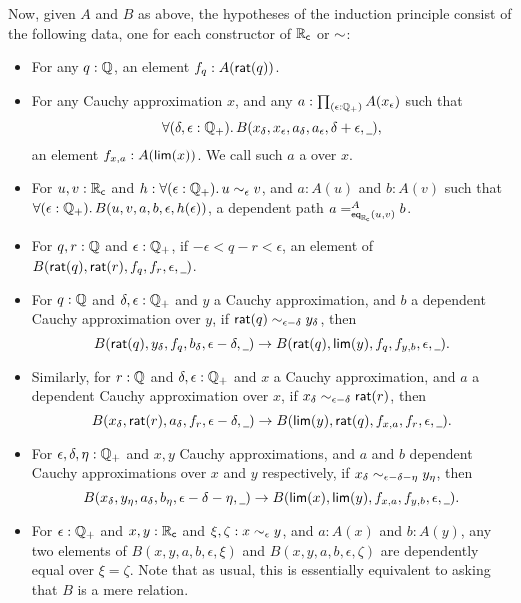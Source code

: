 Now, given $A$ and $B$ as above, the hypotheses of the induction principle consist of the following data, one for each constructor of $\RC$ or $\closesym$:
\begin{itemize}
\item For any $q : \Q$, an element $f_q:A(\rcrat(q))$.
\item For any Cauchy approximation $x$, and any $a:\prd{\epsilon:\Qp} A(x_\epsilon)$ such that
  \begin{equation}
    \fall{\delta, \epsilon : \Qp} B(x_\delta,x_\epsilon,a_\delta,a_\epsilon,\delta+\epsilon,\blank),\label{eq:depCauchyappx}
  \end{equation}
  an element $f_{x,a}:A(\rclim(x))$.  We call such $a$ a  over $x$.
\item For $u, v : \RC$ and $h:\fall{\epsilon : \Qp} u \close\epsilon v$, and $a:A(u)$ and $b:A(v)$ such that $\fall{\epsilon:\Qp} B(u,v,a,b,\epsilon,h(\epsilon))$, a dependent path $\dpath{A}{\rceq(u,v)}{a}{b}$.
\item For $q,r:\Q$ and $\epsilon:\Qp$, if $-\epsilon < q - r < \epsilon$, an element of $B(\rcrat(q),\rcrat(r),f_q,f_r,\epsilon,\blank)$.
\item For $q:\Q$ and $\delta,\epsilon:\Qp$ and $y$ a Cauchy approximation, and $b$ a dependent Cauchy approximation over $y$, if $\rcrat(q) \close{\epsilon - \delta} y_\delta$, then
  \[B(\rcrat(q),y_\delta,f_q,b_\delta,\epsilon-\delta,\blank)
  \to
  B(\rcrat(q),\rclim(y),f_q,f_{y,b},\epsilon,\blank).\]
\item Similarly, for $r:\Q$ and $\delta,\epsilon:\Qp$ and $x$ a Cauchy approximation, and $a$ a dependent Cauchy approximation over $x$, if $x_\delta \close{\epsilon - \delta} \rcrat(r)$, then
  \[B(x_\delta,\rcrat(r),a_\delta,f_r,\epsilon-\delta,\blank) \to
  B(\rclim(y),\rcrat(q),f_{x,a},f_r,\epsilon,\blank).
  \]
\item For $\epsilon,\delta,\eta:\Qp$ and $x,y$ Cauchy approximations, and $a$ and $b$ dependent Cauchy approximations over $x$ and $y$ respectively, if $x_\delta \close{\epsilon - \delta - \eta} y_\eta$, then
  \[ B(x_\delta,y_\eta,a_\delta,b_\eta,{\epsilon - \delta - \eta},\blank)\to
  B(\rclim(x),\rclim(y),f_{x,a},f_{y,b},\epsilon,\blank).\]
\item For $\epsilon:\Qp$ and $x,y:\RC$ and $\xi,\zeta:x\close{\epsilon} y$, and $a:A(x)$ and $b:A(y)$, any two elements of $B(x,y,a,b,\epsilon,\xi)$ and $B(x,y,a,b,\epsilon,\zeta)$ are dependently equal over $\xi=\zeta$.
  Note that as usual, this is essentially equivalent to asking that $B$ is a mere relation.
\end{itemize}
